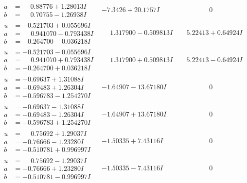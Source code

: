 \documentclass[1p]{elsarticle_modified}
\theoremstyle{definition}
\begin{document}
$$\begin{array}{c|c|c}
\begin{aligned}
a &= \phantom{-}0.88776 + 1.28013 I \\
b &= \phantom{-}0.70755 - 1.26938 I\end{aligned}
 & -7.3426 + 20.1757 I & \phantom{-0.000000 } 0 \\ \hline\begin{aligned}
u &= -0.521703 + 0.055696 I \\
a &= \phantom{-}0.941070 - 0.793438 I \\
b &= -0.264700 - 0.036218 I\end{aligned}
 & \phantom{-}1.317900 - 0.509813 I & \phantom{-}5.22413 + 0.64924 I \\ \hline\begin{aligned}
u &= -0.521703 - 0.055696 I \\
a &= \phantom{-}0.941070 + 0.793438 I \\
b &= -0.264700 + 0.036218 I\end{aligned}
 & \phantom{-}1.317900 + 0.509813 I & \phantom{-}5.22413 - 0.64924 I \\ \hline\begin{aligned}
u &= -0.69637 + 1.31088 I \\
a &= -0.69483 + 1.26304 I \\
b &= -0.596783 - 1.254270 I\end{aligned}
 & -1.64907 - 13.67180 I & \phantom{-0.000000 } 0 \\ \hline\begin{aligned}
u &= -0.69637 - 1.31088 I \\
a &= -0.69483 - 1.26304 I \\
b &= -0.596783 + 1.254270 I\end{aligned}
 & -1.64907 + 13.67180 I & \phantom{-0.000000 } 0 \\ \hline\begin{aligned}
u &= \phantom{-}0.75692 + 1.29037 I \\
a &= -0.76666 - 1.23280 I \\
b &= -0.510781 + 0.996997 I\end{aligned}
 & -1.50335 + 7.43116 I & \phantom{-0.000000 } 0 \\ \hline\begin{aligned}
u &= \phantom{-}0.75692 - 1.29037 I \\
a &= -0.76666 + 1.23280 I \\
b &= -0.510781 - 0.996997 I\end{aligned}
 & -1.50335 - 7.43116 I & \phantom{-0.000000 } 0 \\ \hline\begin{aligned}

\end{aligned}
\end{array}$$
\end{document}
